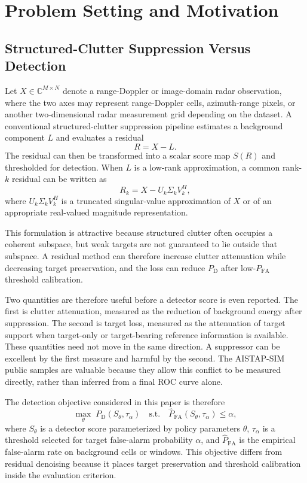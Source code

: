\documentclass[journal]{IEEEtran}
\begin{document}
\section{Problem Setting and Motivation}

\subsection{Structured-Clutter Suppression Versus Detection}

Let $X \in \mathbb{C}^{M \times N}$ denote a range-Doppler or image-domain radar observation, where the two axes may represent range-Doppler cells, azimuth-range pixels, or another two-dimensional radar measurement grid depending on the dataset. A conventional structured-clutter suppression pipeline estimates a background component $L$ and evaluates a residual
\begin{equation}
    R = X - L .
\end{equation}
The residual can then be transformed into a scalar score map $S(R)$ and thresholded for detection. When $L$ is a low-rank approximation, a common rank-$k$ residual can be written as
\begin{equation}
    R_k = X - U_k \Sigma_k V_k^{H},
\end{equation}
where $U_k \Sigma_k V_k^{H}$ is a truncated singular-value approximation of $X$ or of an appropriate real-valued magnitude representation.

This formulation is attractive because structured clutter often occupies a coherent subspace, but weak targets are not guaranteed to lie outside that subspace. A residual method can therefore increase clutter attenuation while decreasing target preservation, and the loss can reduce $P_{\mathrm{D}}$ after low-$P_{\mathrm{FA}}$ threshold calibration.

Two quantities are therefore useful before a detector score is even reported. The first is clutter attenuation, measured as the reduction of background energy after suppression. The second is target loss, measured as the attenuation of target support when target-only or target-bearing reference information is available. These quantities need not move in the same direction. A suppressor can be excellent by the first measure and harmful by the second. The AISTAP-SIM public samples are valuable because they allow this conflict to be measured directly, rather than inferred from a final ROC curve alone.

The detection objective considered in this paper is therefore
\begin{equation}
    \max_{\theta} \; P_{\mathrm{D}}(S_\theta, \tau_\alpha)
    \quad \mathrm{s.t.} \quad
    \widehat{P}_{\mathrm{FA}}(S_\theta, \tau_\alpha) \leq \alpha ,
\end{equation}
where $S_\theta$ is a detector score parameterized by policy parameters $\theta$, $\tau_\alpha$ is a threshold selected for target false-alarm probability $\alpha$, and $\widehat{P}_{\mathrm{FA}}$ is the empirical false-alarm rate on background cells or windows. This objective differs from residual denoising because it places target preservation and threshold calibration inside the evaluation criterion.
\end{document}
